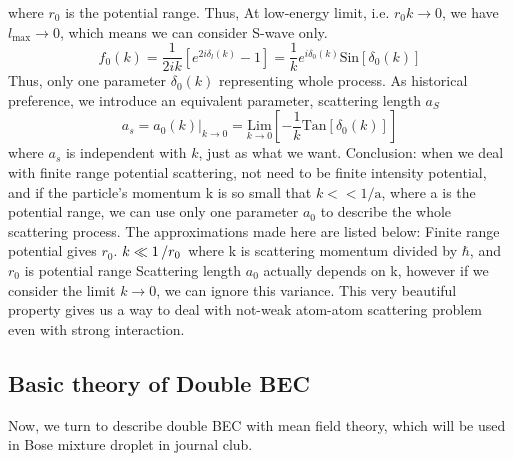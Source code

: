 where $r_0$ is the potential range. Thus, At low-energy limit, i.e. $r_0k\to 0$, we have $l_{\max }\to 0$, which means we can consider S-wave only.
\begin{equation}
f_0(k)=\frac{1}{2ik}\left[e^{2i\delta_l(k)}-1\right]=\frac{1}{k}e^{i \delta _0(k)}\text{Sin}\left[\delta _0(k)\right]
\end{equation}
Thus, only one parameter $\delta _0(k)$ representing whole process. As historical preference, we introduce an equivalent parameter, scattering length $a_S$
\begin{equation}
a_s=a_0(k)|_{k\to0}=\underset{k\to0}{\text{Lim}}\left[-\frac{1}{k}\text{Tan}\left[\delta _0(k)\right]\right]
\end{equation}
where $a_s$ is independent with $k$, just as what we want.
Conclusion: when we deal with finite range potential scattering, not need to be finite intensity potential, and if the particle's momentum k is so small that $k<<\text{1/a}$, where a is the potential range, we can use only one parameter $a_0$ to describe the whole scattering process. The approximations made here are listed below:
Finite range potential gives $r_0$.
$k\ll 1\left/r_0 \right.$ where k is scattering momentum divided by $\hbar$, and $r_0$ is potential range
Scattering length $a_0$ actually depends on k, however if we consider the limit $k\to 0$, we can ignore this variance.
This very beautiful property gives us a way to deal with not-weak atom-atom scattering problem even with strong interaction.

\subsection{Basic theory of Double BEC}
Now, we turn to describe double BEC with mean field theory, which will be used in Bose mixture droplet in journal club.
